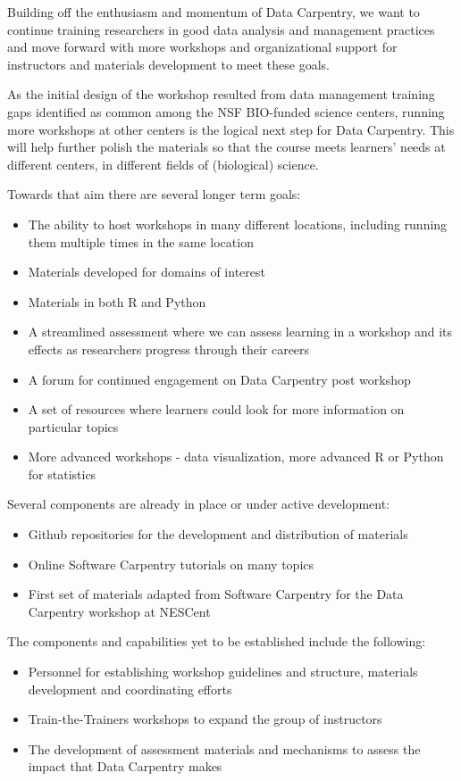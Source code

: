 \documentclass[15]{idcc}
\begin{document}
Building off the enthusiasm and momentum of Data Carpentry, we want to continue training researchers in good data analysis and management practices and move forward with more workshops and organizational support for instructors and materials development to meet these goals.

As the initial design of the workshop resulted from data management training gaps identified as common among the  NSF BIO-funded science centers, running more workshops at other centers is the logical next step for Data Carpentry.
This will help further polish the materials so that the course meets learners' needs at different centers, in different fields of (biological) science. 

 
Towards that aim there are several longer term goals:
\begin{itemize}
\item The ability to host workshops in many different locations, including running them multiple times in the same location 
\item Materials developed for domains of interest 
\item Materials in both R and Python 
\item A streamlined assessment where we can assess learning in a workshop and its effects as researchers progress through their careers
\item A forum for continued engagement on Data Carpentry post workshop
\item A set of resources where learners could look for more information on particular topics
\item More advanced workshops - data visualization, more advanced R or Python for statistics
\end{itemize}

Several components are already in place or under active development:
\begin{itemize}
\item Github repositories for the development and distribution of materials
\item Online Software Carpentry tutorials on many topics
\item First set of materials adapted from Software Carpentry for the Data Carpentry workshop at NESCent
\end{itemize}

The components and capabilities yet to be established include the following:
\begin{itemize}
\item Personnel for establishing workshop guidelines and structure, materials development and coordinating efforts
\item Train-the-Trainers workshops to expand the group of instructors
\item The development of assessment materials and mechanisms to assess the impact that Data Carpentry makes
\end{itemize}
\end{document}
